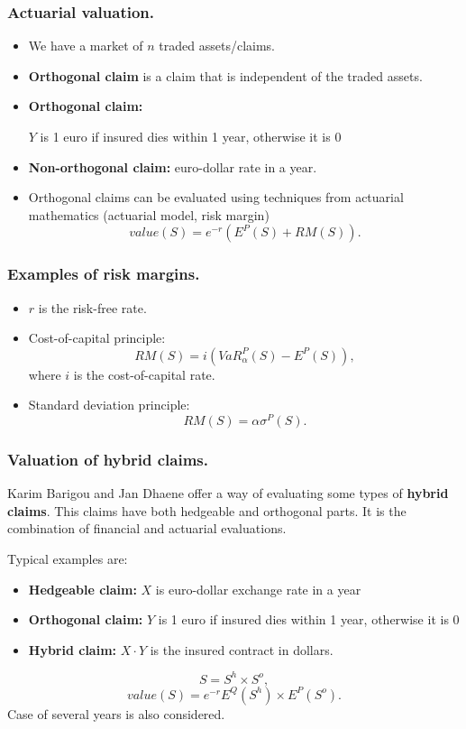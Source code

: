 \documentclass{beamer}
\begin{document}
\begin{frame}[fragile]
\frametitle{Actuarial valuation.}
\begin{itemize}
\item We have a market of $n$ traded assets/claims.
\item \textbf{Orthogonal claim} is a claim that is independent of the traded assets.
\item \textbf{Orthogonal claim:}

$Y$ is 1 euro if insured dies within 1 year, otherwise it is 0
\item \textbf{Non-orthogonal claim:} euro-dollar rate in a year.
\item Orthogonal claims can be evaluated using techniques from actuarial mathematics (actuarial model, risk margin)
$$value(S) = e^{-r}(E^P(S) + RM(S)).$$
\end{itemize}
\end{frame}
\begin{frame}[fragile]
\frametitle{Examples of risk margins.}
\begin{itemize}
\item $r$ is the risk-free rate.
\item Cost-of-capital principle:
$$RM(S) = i(VaR^P_{\alpha}(S) - E^P(S)),$$
where $i$ is the cost-of-capital rate.
\item Standard deviation principle:
$$RM(S) = \alpha \sigma^P(S).$$
\end{itemize}
\end{frame}
\begin{frame}[fragile]
\frametitle{Valuation of hybrid claims.}
Karim Barigou and Jan Dhaene offer a way of evaluating some types of \textbf{hybrid claims}. This claims have both hedgeable and orthogonal parts. It is the combination of financial and actuarial evaluations.

Typical examples are:
\begin{itemize}
\item \textbf{Hedgeable claim:} $X$ is euro-dollar exchange rate in a year
\item \textbf{Orthogonal claim:} $Y$ is 1 euro if insured dies within 1 year, otherwise it is 0
\item \textbf{Hybrid claim:} $X\cdot Y$ is the insured contract in dollars.
\end{itemize}
$$S = S^h\times S^o,$$
$$value(S) = e^{-r} E^Q(S^h)\times E^P(S^o).$$
Case of several years is also considered.
\end{frame}
\end{document}
